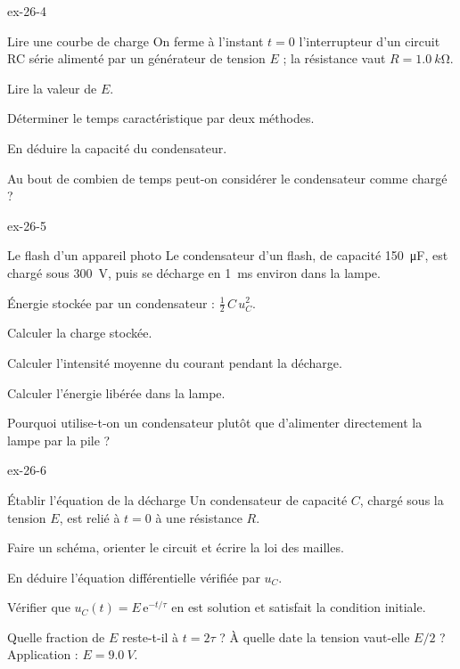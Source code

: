 \begin{blocLivre}{ex-26-4}
\begin{exercice}[1]{Lire une courbe de charge}
On ferme à l'instant $t=0$ l'interrupteur d'un circuit RC série alimenté par un générateur de tension $E$ ; la résistance
vaut $R=\qty{1,0}{k\ohm}$.
\begin{questions}
\item Lire la valeur de $E$.
\item Déterminer le temps caractéristique par deux méthodes.
\item En déduire la capacité du condensateur.
\item Au bout de combien de temps peut-on considérer le condensateur comme chargé ?
\end{questions}
\end{exercice}
\end{blocLivre}
\begin{blocLivre}{ex-26-5}
\begin{exercice}[1]{Le flash d'un appareil photo}
Le condensateur d'un flash, de capacité \qty{150}{\micro F}, est chargé sous \qty{300}{V}, puis se décharge en \qty{1}{ms} environ dans la
lampe.
\begin{donnees}
Énergie stockée par un condensateur : $\frac12\,C\,u_C^2$.
\end{donnees}
\begin{questions}
\item Calculer la charge stockée.
\item Calculer l'intensité moyenne du courant pendant la décharge.
\item Calculer l'énergie libérée dans la lampe.
\item Pourquoi utilise-t-on un condensateur plutôt que d'alimenter directement la lampe par la pile ?
\end{questions}
\end{exercice}
\end{blocLivre}
\begin{blocLivre}{ex-26-6}
\begin{exercice}[2]{Établir l'équation de la décharge}
Un condensateur de capacité $C$, chargé sous la tension $E$, est relié à $t=0$ à une résistance $R$.
\begin{questions}
\item Faire un schéma, orienter le circuit et écrire la loi des mailles.
\item En déduire l'équation différentielle vérifiée par $u_C$.
\item Vérifier que $u_C(t)=E\,\mathrm{e}^{-t/\tau}$ en est solution et satisfait la condition initiale.
\item Quelle fraction de $E$ reste-t-il à $t=2\tau$ ? À quelle date la tension vaut-elle $E/2$ ? Application : $E=\qty{9,0}{V}$.
\end{questions}
\end{exercice}
\end{blocLivre}
